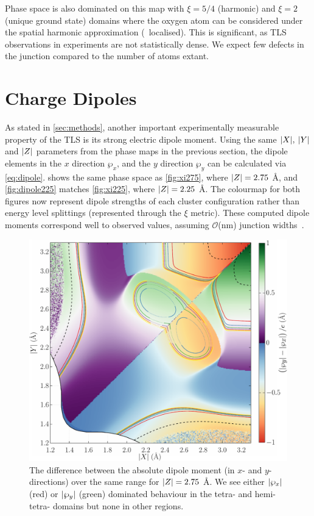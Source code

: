 Phase space is also dominated on this map with $\xi=5/4$ (harmonic) and $\xi=2$ (unique ground state) domains where the oxygen atom can be considered under the spatial harmonic approximation (\ie\ localised).
This is significant, as TLS observations in experiments are not statistically dense.
We expect few defects in the junction compared to the number of atoms extant.

\section{Charge Dipoles}\label{sec:dipole}

As stated in \cref{sec:methods}, another important experimentally measurable property of the TLS is its strong electric dipole moment.
Using the same $\lvert X\rvert, \: \lvert Y\rvert$ and $\lvert Z\rvert$ parameters from the phase maps in the previous section, the dipole elements in the $x$ direction $\wp_x$, and the $y$ direction $\wp_y$ can be calculated via \cref{eq:dipole}.
 shows the same phase space as \cref{fig:xi275}, where $\abs{Z} = 2.75$ \AA, and \cref{fig:dipole225} matches \cref{fig:xi225}, where $\lvert Z\rvert = 2.25$ \AA.
The colourmap for both figures now represent dipole strengths of each cluster configuration rather than energy level splittings (represented through the $\xi$ metric).
These computed dipole moments correspond well to observed values, assuming $\mathcal{O}$(nm) junction widths~\cite{Martinis2005, Cole2010}.

\begin{figure}[htp]
  \includegraphics[width=\textwidth]{figures/dipole275}
  \caption[Dipole Phase Map, With $\abs{Z} = 2.75$ \AA]{\label{fig:dipole275}The difference between the absolute dipole moment (in $x$- and $y$-directions) over the same range for $\abs{Z} = 2.75$ \AA. We see either $\lvert\wp_x\rvert$ (red) or $\lvert\wp_y\rvert$ (green) dominated behaviour in the tetra- and hemi-tetra- domains but none in other regions.}
\end{figure}

